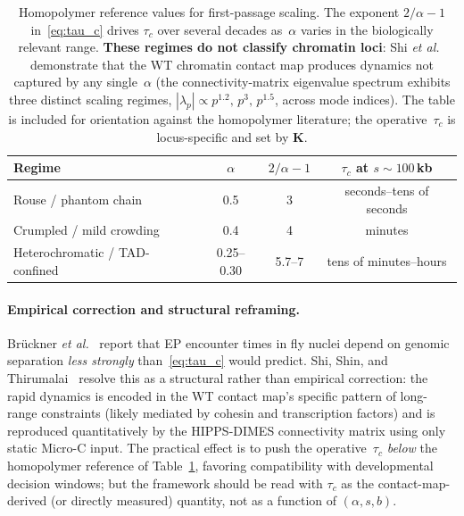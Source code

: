 \documentclass[11pt]{article}
\begin{document}
\begin{table}[h]
\centering
\begin{tabular}{lccc}
\toprule
Regime & $\alpha$ & $2/\alpha-1$ & $\tau_c$ at $s\!\sim\!100$\,kb \\
\midrule
Rouse / phantom chain          & 0.5  & 3   & seconds--tens of seconds \\
Crumpled / mild crowding       & 0.4  & 4   & minutes \\
Heterochromatic / TAD-confined & 0.25--0.30 & 5.7--7 & tens of minutes--hours \\
\bottomrule
\end{tabular}
\caption{Homopolymer reference values for first-passage scaling. The
exponent $2/\alpha-1$ in~\eqref{eq:tau_c} drives $\tau_c$ over several
decades as~$\alpha$ varies in the biologically relevant range.
\textbf{These regimes do not classify chromatin loci}: Shi
\textit{et al.}~\cite{Shi2025} demonstrate that the WT chromatin contact
map produces dynamics not captured by any single~$\alpha$ (the
connectivity-matrix eigenvalue spectrum exhibits three distinct scaling
regimes, $|\lambda_p|\propto p^{1.2},\,p^{3},\,p^{1.5}$, across mode
indices). The table is included for orientation against the homopolymer
literature; the operative~$\tau_c$ is locus-specific and set by
$\mathbf{K}$.}
\label{tab:regimes}
\end{table}

\paragraph{Empirical correction and structural reframing.} Br\"uckner
\textit{et al.}~\cite{Bruckner2023} report that EP encounter times in fly
nuclei depend on genomic separation \emph{less strongly}
than~\eqref{eq:tau_c} would predict. Shi, Shin, and
Thirumalai~\cite{Shi2025} resolve this as a structural rather than
empirical correction: the rapid dynamics is encoded in the WT contact
map's specific pattern of long-range constraints (likely mediated by
cohesin and transcription factors) and is reproduced quantitatively by
the HIPPS-DIMES connectivity matrix using only static Micro-C input. The
practical effect is to push the operative~$\tau_c$ \emph{below} the
homopolymer reference of Table~\ref{tab:regimes}, favoring compatibility
with developmental decision windows; but the framework should be read
with $\tau_c$ as the contact-map-derived (or directly measured) quantity,
not as a function of $(\alpha,s,b)$.
\end{document}
